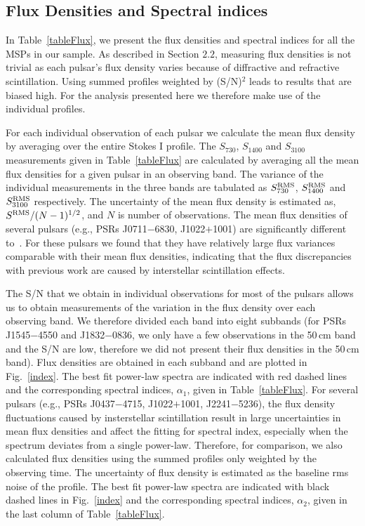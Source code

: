 \documentclass[useAMS,usenatbib]{mn2e}
\begin{document}
\subsection{Flux Densities and Spectral indices}


In Table~\ref{tableFlux}, we present the flux densities and spectral indices 
for all the MSPs in our sample. As described in Section $2.2$, measuring flux 
densities is not trivial as each pulsar's flux density varies because 
of diffractive and refractive scintillation. Using summed profiles weighted by 
(S/N)$^2$ leads to results that are biased high. For the analysis presented 
here we therefore make use of the individual profiles. 
%

For each individual observation of each pulsar we calculate the mean flux 
density by averaging over the entire Stokes I profile. 
%
The $S_{730}$, $S_{1400}$ and $S_{3100}$ measurements given in Table~\ref{tableFlux} 
are calculated by averaging all the mean flux densities for a given pulsar 
in an observing band.  
%
The variance of the individual measurements in the three bands are tabulated 
as $S^{\rm{RMS}}_{730}$, $S^{\rm{RMS}}_{1400}$ and $S^{\rm{RMS}}_{3100}$ respectively. 
%
The uncertainty of the mean flux density is estimated as, $S^{\rm{RMS}}/(N-1)^{1/2}$, 
and $N$ is number of observations.
%
The mean flux densities of several pulsars (e.g., PSRs J0711$-$6830, J1022$+$1001) 
are significantly different to~\citet{Yan11}. For these pulsars we found that 
they have relatively large flux variances comparable with their mean flux densities, 
indicating that the flux discrepancies with previous work are caused by interstellar 
scintillation effects.
%

The S/N that we obtain in individual observations for most of the pulsars allows us 
to obtain measurements of the variation in the flux density over each observing band. 
We therefore divided each band into eight subbands (for PSRs J1545$-$4550 and J1832$-$0836, 
we only have a few observations in the 50\,cm band and the S/N are low, therefore we 
did not present their flux densities in the 50\,cm band).
%
Flux densities are obtained in each subband and are plotted in Fig.~\ref{index}. 
%
The best fit power-law spectra are indicated with red dashed lines and the corresponding 
spectral indices, $\alpha_1$, given in Table~\ref{tableFlux}.
%
For several pulsars (e.g., PSRs J0437$-$4715, J1022$+$1001, J2241$-$5236), the flux density 
fluctuations caused by insterstellar scintillation result in large uncertainties in 
mean flux densities and affect the fitting for spectral index, especially when the 
spectrum deviates from a single power-law.
%
Therefore, for comparison, we also calculated flux densities using the summed profiles 
only weighted by the observing time. The uncertainty of flux density is estimated 
as the baseline rms noise of the profile. 
%
The best fit power-law spectra are indicated with black dashed lines in Fig.~\ref{index} 
and the corresponding spectral indices, $\alpha_2$, given in the last column of Table~\ref{tableFlux}.
%
\end{document}
